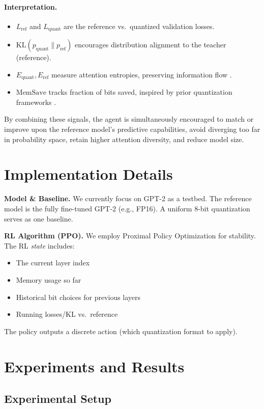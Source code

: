 \documentclass{article}
\begin{document}
\paragraph{Interpretation.}
\begin{itemize}
	\item $L_{\mathrm{ref}}$ and $L_{\mathrm{quant}}$ are the reference vs.\ quantized validation losses. 
	\item $\mathrm{KL}(p_{\mathrm{quant}}\|\!p_{\mathrm{ref}})$ encourages distribution alignment to the teacher (reference).
	\item $E_{\mathrm{quant}}, E_{\mathrm{ref}}$ measure attention entropies, preserving information flow \cite{Choi2018pact}.
	\item $\mathrm{MemSave}$ tracks fraction of bits saved, inspired by prior quantization frameworks \cite{Jacob2018quant}.
\end{itemize}
By combining these signals, the agent is simultaneously encouraged to match or improve upon the reference model's predictive capabilities, avoid diverging too far in probability space, retain higher attention diversity, and reduce model size.

\section{Implementation Details}
\textbf{Model \& Baseline.}
We currently focus on GPT-2 as a testbed. The reference model is the fully fine-tuned GPT-2 (e.g., FP16). A uniform 8-bit quantization serves as one baseline.

\textbf{RL Algorithm (PPO).}
We employ Proximal Policy Optimization \cite{ppo2017} for stability. The RL \emph{state} includes:
\begin{itemize}
	\item The current layer index
	\item Memory usage so far
	\item Historical bit choices for previous layers
	\item Running losses/KL vs.\ reference 
\end{itemize}
The policy outputs a discrete action (which quantization format to apply).

\section{Experiments and Results}

\subsection{Experimental Setup}
\end{document}
